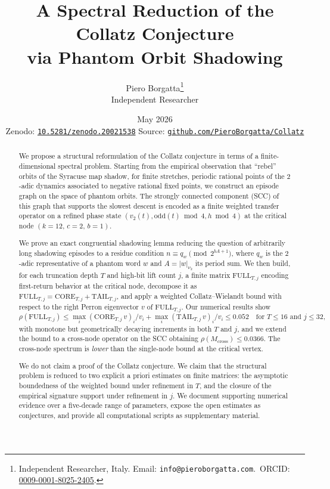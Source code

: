 \documentclass[11pt,a4paper]{article}
\title{
  A Spectral Reduction of the Collatz Conjecture \\
  via Phantom Orbit Shadowing
}
\author{
  Piero Borgatta\thanks{Independent Researcher, Italy. Email: \texttt{info@pieroborgatta.com}.\
    ORCID: \href{https://orcid.org/0009-0001-8025-2405}{0009-0001-8025-2405}.} \\
  \small Independent Researcher
}
\date{May 2026 \\[2pt]
  \small\normalfont
  Zenodo: \href{https://doi.org/10.5281/zenodo.20021538}{\texttt{10.5281/zenodo.20021538}} \quad
  Source: \href{https://github.com/PieroBorgatta/Collatz}{\texttt{github.com/PieroBorgatta/Collatz}}
}
\theoremstyle{definition}
\newcommand{\full}{\mathrm{FULL}}
\newcommand{\core}{\mathrm{CORE}}
\newcommand{\tail}{\mathrm{TAIL}}
\newcommand{\spec}{\rho}
\begin{document}
\maketitle

\begin{abstract}
We propose a structural reformulation of the Collatz conjecture in terms
of a finite-dimensional spectral problem. Starting from the empirical
observation that ``rebel'' orbits of the Syracuse map shadow,
for finite stretches, periodic rational points of the $2$-adic dynamics
associated to negative rational fixed points, we construct an episode
graph on the space of phantom orbits. The strongly connected
component (SCC) of this graph that supports the slowest descent is
encoded as a finite weighted transfer operator on a refined phase
state $(v_2(t), \mathrm{odd}(t)\bmod 4, h\bmod 4)$ at the critical
node $(k=12,\, c=2,\, b=1)$.

We prove an exact congruential shadowing lemma reducing the question
of arbitrarily long shadowing episodes to a residue condition
$n\equiv q_w\pmod{2^{bA+1}}$, where $q_w$ is the $2$-adic
representative of a phantom word $w$ and $A=|w|_{\nu_2}$ its period
sum. We then build, for each truncation depth $T$ and high-bit lift
count $j$, a finite matrix $\full_{T,j}$ encoding first-return
behavior at the critical node, decompose it as
$\full_{T,j} = \core_{T,j} + \tail_{T,j}$, and apply a weighted
Collatz--Wielandt bound with respect to the right Perron eigenvector
$v$ of $\full_{T,j}$. Our numerical results show
\[
\spec(\full_{T,j})
\le
\max_i (\core_{T,j}\, v)_i / v_i + \max_i (\tail_{T,j}\, v)_i / v_i
\le 0.052
\quad
\text{for $T \le 16$ and $j \le 32$,}
\]
with monotone but geometrically decaying increments in both $T$ and
$j$, and we extend the bound to a cross-node operator on the SCC
obtaining $\spec(M_{\mathrm{cross}}) \le 0.0366$. The cross-node
spectrum is \emph{lower} than the single-node bound at the critical
vertex.

We do not claim a proof of the Collatz conjecture. We claim that the
structural problem is reduced to two explicit a priori estimates on
finite matrices: the asymptotic boundedness of the weighted bound
under refinement in $T$, and the closure of the empirical signature
support under refinement in $j$. We document supporting numerical
evidence over a five-decade range of parameters, expose the open
estimates as conjectures, and provide all computational scripts as
supplementary material.
\end{abstract}
\end{document}
